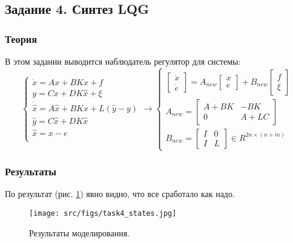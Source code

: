 \subsection{Задание 4. Синтез LQG}

\subsubsection{Теория}
В этом задании выводится наблюдатель регулятор для системы:
\[
        \begin{cases}
                \dot{x} = A x + B  K \hat{x} + f \\
                y = Cx + DK\hat{x} + \xi \\
                \dot{\hat{x}} = A \hat{x} + B  K \hat{x} + L(\hat{y} - y) \\
                \hat{y} = C \hat{x} + D K \hat{x} \\
                \hat{x} = x - e \\
        \end{cases} \rightarrow
        \begin{cases}
            \begin{bmatrix} 
                \dot{x} \\
                \dot{e}
            \end{bmatrix} = 
            A_{new}
            \begin{bmatrix} 
              x \\
              e
            \end{bmatrix} 
          + B_{new} 
          \begin{bmatrix} 
            f \\
            \xi
          \end{bmatrix} 
            \\
            A_{new} = 
            \begin{bmatrix} 
                A + BK & -BK\\
                0 & A + LC
            \end{bmatrix} \\
            B_{new} = 
            \begin{bmatrix} 
                I & 0\\
                I & L
            \end{bmatrix} \in R^{2n \times (n + m)}
         \end{cases}
\]

\subsubsection{Результаты}
По результат (рис. \ref{fig:task4}) явно видно, что все сработало как надо.

\begin{figure}[ht!]
    \centering
    \texttt{[image: src/figs/task4\_states.jpg]}
    \caption{Результаты моделирования.}
    \label{fig:task4}
\end{figure}




\FloatBarrier

